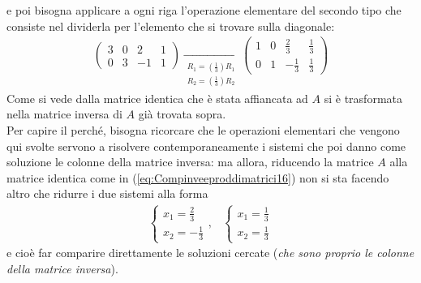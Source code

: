 \documentclass{book}
\theoremstyle{definition}
\theoremstyle{plain}
\begin{document}
e poi bisogna applicare a ogni riga l'operazione elementare del
secondo tipo che consiste nel dividerla per l'elemento che si
trovare sulla diagonale:
\begin{eqnarray}
  \label{eq:Compinveeproddimatrici16}
  \left(\begin{array}{cc|cc}
    3 & 0 & 2 & 1\\
    0 & 3 & -1 & 1
  \end{array}\right) \underset{
  \begin{matrix}
    R_1=\left(\frac{1}{3}\right) R_1\\
    R_2=\left(\frac{1}{3}\right) R_2
  \end{matrix}
  }{\to}\left(
  \begin{array}{cc|cc}
    1 & 0 & \frac{2}{3} & \frac{1}{3}\\
    0 & 1 & -\frac{1}{3}& \frac{1}{3}
  \end{array}\right)
\end{eqnarray}
Come si vede dalla matrice identica che è stata affiancata ad $A$
si è trasformata nella matrice inversa di $A$ già trovata sopra.\\
Per capire il perché, bisogna ricorcare che le operazioni elementari
che vengono qui svolte servono a risolvere contemporaneamente i
sistemi che poi danno come soluzione le colonne della matrice
inversa: ma allora, riducendo la matrice $A$ alla matrice identica
come in (\ref{eq:Compinveeproddimatrici16}) non si sta facendo altro
che ridurre i due sistemi alla forma
\begin{eqnarray*}
  \begin{cases}
    x_1=\frac{2}{3}\\
    x_2=-\frac{1}{3}
  \end{cases}, &
                 \begin{cases}
                   x_1=\frac{1}{3}\\
                   x_2=\frac{1}{3}
                 \end{cases}
\end{eqnarray*}
e cioè far comparire direttamente le soluzioni cercate (\emph{che sono
proprio le colonne della matrice inversa}).
\end{document}
